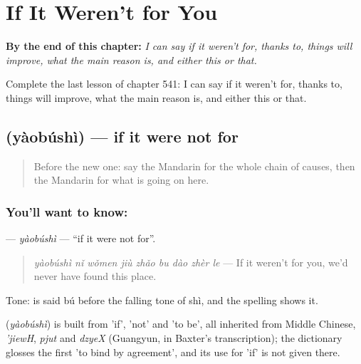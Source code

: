 
\chapter{If It Weren't for You}
\label{ch:zh-if-it-weren-t-for-you}

\begin{chapteropening}
\textbf{By the end of this chapter:} \emph{I can say if it weren't for, thanks to, things will improve, what the main reason is, and either this or that.}

Complete the last lesson of chapter 541: I can say if it weren't for, thanks to, things will improve, what the main reason is, and either this or that.
\end{chapteropening}

\section[\texorpdfstring{\zh{要不是} (yàobúshì)}{要不是 (yàobúshì)}]{ (yàobúshì) — if it were not for}

\label{lesson:ZH-C541-yaobushi}



\begin{quote}
Before the new one: say the Mandarin for the whole chain of causes, then the Mandarin for what is going on here.
\end{quote}

\subsection*{You'll want to know: }
\textbf{} — \emph{yàobúshì} — \textquotedblleft{}if it were not for\textquotedblright{}.

\begin{quote}
\textbf{} \emph{yàobúshì nǐ wǒmen jiù zhǎo bu dào zhèr le} — If it weren't for you, we'd never have found this place.
\end{quote}

Tone:  is said bú before the falling tone of shì, and the spelling shows it.

\begin{cousinweb}
\textbf{} (\emph{yàobúshì}) is built from  'if',  'not' and  'to be', all inherited from Middle Chinese, \emph{'jiewH}, \emph{pjut} and \emph{dzyeX} (Guangyun, in Baxter's transcription); the dictionary glosses the first 'to bind by agreement', and its use for 'if' is not given there.
\end{cousinweb}


